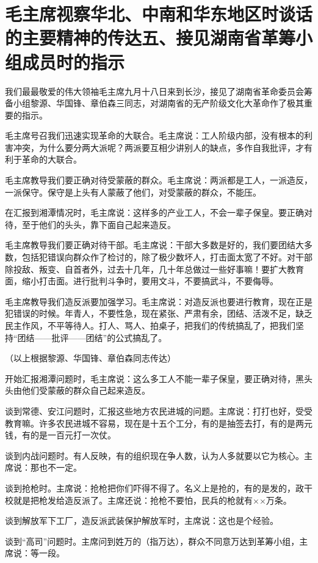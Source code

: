 \section[毛主席视察华北、中南和华东地区时谈话的主要精神的传达五、接见湖南省革筹小组成员时的指示]{毛主席视察华北、中南和华东地区时谈话的主要精神的传达五、接见湖南省革筹小组成员时的指示}


我们最最敬爱的伟大领袖毛主席九月十八日来到长沙，接见了湖南省革命委员会筹备小组黎源、华国锋、章伯森三同志，对湖南省的无产阶级文化大革命作了极其重要的指示。

毛主席号召我们迅速实现革命的大联合。毛主席说：工人阶级内部，没有根本的利害冲突，为什么要分两大派呢？两派要互相少讲别人的缺点，多作自我批评，才有利于革命的大联合。

毛主席教导我们要正确对待受蒙蔽的群众。毛主席说：两派都是工人，一派造反，一派保守。保守是上头有人蒙蔽了他们，对受蒙蔽的群众，不能压。

在汇报到湘潭情况时，毛主席说：这样多的产业工人，不会一辈子保皇。要正确对待，至于他们的头头，靠下面自己起来造反。

毛主席教导我们要正确对待干部。毛主席说：干部大多数是好的，我们要团结大多数，包括犯错误向群众作了检讨的，除了极少数坏人，打击面太宽了不好。对干部除投敌、叛变、自首者外，过去十几年，几十年总做过一些好事嘛！要扩大教育面，缩小打击面。进行批判斗争时，要用文斗，不要搞武斗，不要侮辱。

毛主席教导我们造反派要加强学习。毛主席说：对造反派也要进行教育，现在正是犯错误的时候。年青人，不要性急，现在紧张、严肃有余，团结、活泼不足，缺乏民主作风，不平等待人。打人、骂人、拍桌子，把我们的传统搞乱了，把我们坚持“团结——批评——团结”的公式搞乱了。

（以上根据黎源、华国锋、章伯森同志传达）

开始汇报湘潭问题时，毛主席说：这么多工人不能一辈子保皇，要正确对待，黑头头由他们受蒙蔽的群众自己起来造反。

谈到常德、安江问题时，汇报这些地方农民进城的问题。主席说：打打也好，受受教育嘛。许多农民进城不容易，现在是十五个工分，有的是抽签去打，有的是两元钱，有的是一百元打一次仗。

谈到内战问题时。有人反映，有的组织现在争人数，认为人多就要以它为核心。主席说：那也不一定。

谈到抢枪时。主席说：抢枪把你们吓得不得了。名义上是抢的，有的是发的，政干校就是把枪发给造反派了。主席还说：抢枪不要怕，民兵的枪就有××万条。

谈到解放军下工厂，造反派武装保护解放军时，主席说：这也是个经验。

谈到“高司”问题时。主席问到姓万的（指万达），群众不同意万达到革筹小组，主席说：等一段。

